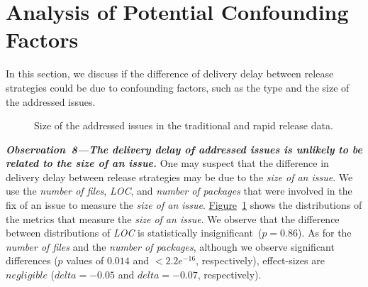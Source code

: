 \section{Analysis of Potential Confounding Factors} \label{sec:discussion}
In this section, we discuss if the difference of delivery delay between release
strategies could be due to confounding factors, such as the type and the size of
the addressed issues.\\
\begin{figure}
	\centering
	\caption{Size of the addressed issues in the traditional and rapid release data.}
	\label{fig:issue_granularity}
\end{figure}

\noindent\textit{\textbf{Observation~8---The delivery delay of addressed issues is unlikely to be
related to the size of an issue.}}
One may suspect that the difference in delivery delay between release
strategies may be due to the \textit{size of an issue}. We use the
\textit{number of files}, \textit{LOC}, and \textit{number of packages} that
were involved in the fix of an issue to measure the \textit{size of an issue}.
\hyperref[fig:issue_granularity]{Figure}~\ref{fig:issue_granularity} shows the
distributions of the metrics that measure the \textit{size of an issue}.  We
observe that the difference between distributions of \textit{LOC} is
statistically insignificant~($p=0.86$). As for the \textit{number of files} and
the \textit{number of packages}, although we observe significant differences
($p$ values of $0.014$ and $<2.2e^{-16}$, respectively), effect-sizes are
$negligible$ ($delta=-0.05$ and $delta=-0.07$, respectively).\\

